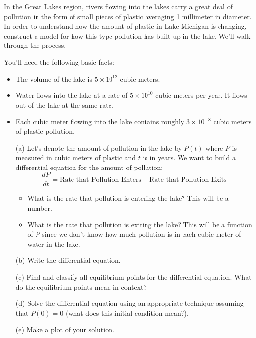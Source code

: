 \begin{problem}
    In the Great Lakes region, rivers flowing into the lakes carry a great deal of
    pollution in the form of small pieces of plastic averaging 1 millimeter in diameter.
    In order to understand how the amount of plastic in Lake Michigan is changing,
    construct a model for how this type pollution has built up in the lake.  We'll walk
    through the process.

    You'll need the following basic facts:
    \begin{itemize}
        \item The volume of the lake is $5 \times 10^{12}$ cubic meters.
        \item Water flows into the lake at a rate of $5 \times 10^{10}$ cubic meters per
            year.  It flows out of the lake at the same rate.
        \item Each cubic meter flowing into the lake contains roughly $3 \times 10^{-8}$
            cubic meters of plastic pollution.
    \end{itemize}
    \begin{enumerate}
        \item[(a)] Let's denote the amount of pollution in the lake by $P(t)$ where $P$ is
            measured in cubic meters of plastic and $t$ is in years.  We want to build a
            differential equation for the amount of pollution:
            \[ \frac{dP}{dt} = \text{Rate that Pollution Enters} - \text{Rate that
            Pollution Exits} \]
            \begin{itemize}
                \item What is the rate that pollution is entering the lake?  This will be
                    a number.
                \item What is the rate that pollution is exiting the lake?  This will be a
                    function of $P$ since we don't know how much pollution is in each
                    cubic meter of water in the lake.
            \end{itemize}
            
        \item[(b)] Write the differential equation.
        \item[(c)] Find and classify all equilibrium points for the differential equation.
            What do the equilibrium points mean in context?
        \item[(d)] Solve the differential equation using an appropriate technique assuming
            that $P(0) = 0$ (what does this initial condition mean?).
        \item[(e)] Make a plot of your solution.
    \end{enumerate}
\end{problem}



